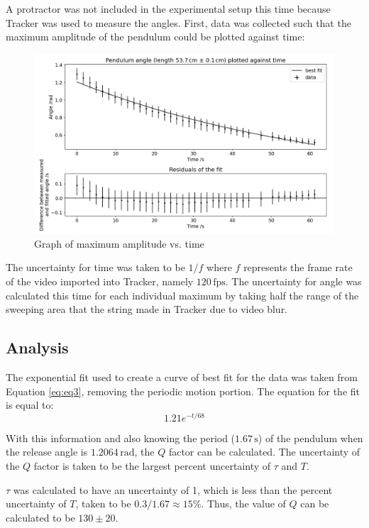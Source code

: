 \documentclass[12pt]{article}
\begin{document}
A protractor was not included in the experimental setup this time because Tracker \cite{tracker} was used to measure the angles. First, data was collected such that the maximum amplitude of the pendulum could be plotted against time:

\begin{figure}[!hptb]
    \centering
    \includegraphics[width=\textwidth]{../figures/max_amplitude_vs_time.png}
    \caption{\centering Graph of maximum amplitude vs. time}
    \label{fig:figure 4}
\end{figure}

The uncertainty for time was taken to be $1/f$ where $f$ represents the frame rate of the video imported into Tracker, namely $120\,\text{fps}$. The uncertainty for angle was calculated this time for each individual maximum by taking half the range of the sweeping area that the string made in Tracker due to video blur.

\subsection{Analysis}
The exponential fit used to create a curve of best fit for the data was taken from Equation \ref{eq:eq3}, removing the periodic motion portion. The equation for the fit is equal to:
\begin{equation}
    1.21e^{-{t}/68}
\end{equation}

With this information and also knowing the period ($1.67\,\text{s}$) of the pendulum when the release angle is $1.2064\,\text{rad}$, the $Q$ factor can be calculated. The uncertainty of the $Q$ factor is taken to be the largest percent uncertainty of $\tau$ and $T$.

$\tau$ was calculated to have an uncertainty of 1, which is less than the percent uncertainty of $T$, taken to be $0.3/1.67 \approx 15\%$. Thus, the value of $Q$ can be calculated to be $130 \pm 20$.
\end{document}
